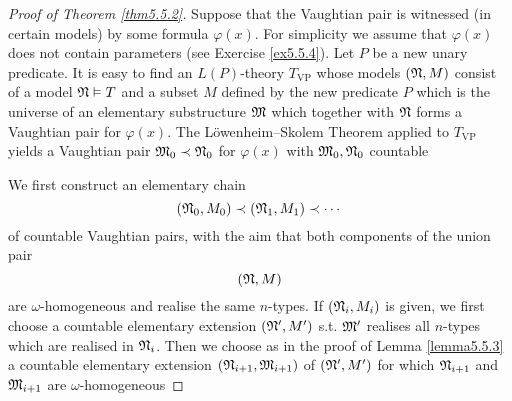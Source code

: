 \documentclass[11pt]{article}
\begin{document}
\begin{proof}[Proof of Theorem \ref{thm5.5.2}]
Suppose that the Vaughtian pair is witnessed (in certain models) by some formula \(\varphi(x)\). For
simplicity we assume that \(\varphi(x)\) does not contain parameters (see Exercise \ref{ex5.5.4}).
Let \(P\) be a new unary predicate. It is easy to find an \(L(P)\)-theory \(T_{\text{VP}}\) whose
models \((\mathfrak{N},M)\) consist of a model \(\mathfrak{N}\vDash T\) and a subset \(M\) defined by the new
predicate \(P\) which is the universe of an elementary substructure \(\mathfrak{M}\) which together
with \(\mathfrak{N}\) forms a Vaughtian pair for \(\varphi(x)\).
The Löwenheim–Skolem Theorem applied to \(T_{\text{VP}}\) yields a Vaughtian pair \(\mathfrak{M}_0\prec\mathfrak{N}_0\)
for \(\varphi(x)\) with \(\mathfrak{M}_0,\mathfrak{N}_0\)  countable

We first construct an elementary chain
\begin{equation*}
(\mathfrak{N}_0,M_0)\prec(\mathfrak{N}_1,M_1)\prec\cdots
\end{equation*}
of countable Vaughtian pairs, with the aim that both components of the union pair
\begin{equation*}
(\mathfrak{N},M)
\end{equation*}
are \(\omega\)-homogeneous and realise the same \(n\)-types. If \((\mathfrak{N}_i,M_i)\) is given, we first choose a
countable elementary extension \((\mathfrak{N}',M')\) s.t. \(\mathfrak{M}'\) realises all \(n\)-types which are
realised in \(\mathfrak{N}_i\).
Then we choose as in the proof of Lemma
\ref{lemma5.5.3} a countable elementary extension \((\mathfrak{N}_{i+1},\mathfrak{M}_{i+1})\) of \((\mathfrak{N}',M')\) for
which \(\mathfrak{N}_{i+1}\) and \(\mathfrak{M}_{i+1}\) are \(\omega\)-homogeneous
\end{proof}
\end{document}
